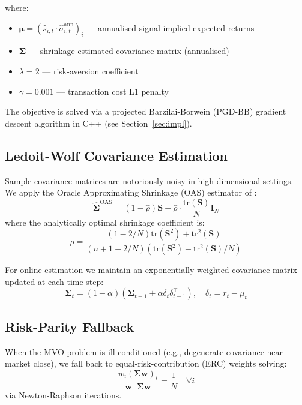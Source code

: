 \documentclass[11pt,a4paper]{article}
\newcommand{\bw}{\bm{w}}
\newcommand{\bmu}{\bm{\mu}}
\newcommand{\bSigma}{\bm{\Sigma}}
\newcommand{\tr}{\mathrm{tr}}
\begin{document}
where:
\begin{itemize}
  \item $\bmu = (\hat{s}_{i,t} \cdot \hat{\sigma}_{i,t}^{\mathrm{ann}})_i$ —
        annualised signal-implied expected returns
  \item $\bSigma$ — shrinkage-estimated covariance matrix (annualised)
  \item $\lambda = 2$ — risk-aversion coefficient
  \item $\gamma = 0.001$ — transaction cost L1 penalty
\end{itemize}

The objective is solved via a projected Barzilai-Borwein (PGD-BB) gradient descent
algorithm in C++ (see Section~\ref{sec:impl}).

\subsection{Ledoit-Wolf Covariance Estimation}

Sample covariance matrices are notoriously noisy in high-dimensional settings.
We apply the Oracle Approximating Shrinkage (OAS) estimator of \citet{chen2010}:
\begin{equation}
  \hat{\bSigma}^{\mathrm{OAS}} = (1 - \hat{\rho}) \mathbf{S} +
  \hat{\rho} \cdot \frac{\tr(\mathbf{S})}{N} \mathbf{I}_N
\end{equation}
where the analytically optimal shrinkage coefficient is:
\begin{equation}
  \hat{\rho} = \frac{(1 - 2/N)\tr(\mathbf{S}^2) + \tr^2(\mathbf{S})}
               {(n + 1 - 2/N)(\tr(\mathbf{S}^2) - \tr^2(\mathbf{S})/N)}
\end{equation}

For online estimation we maintain an exponentially-weighted covariance matrix updated
at each time step:
\begin{equation}
  \bSigma_t = (1 - \alpha)(\bSigma_{t-1} + \alpha \delta_t \delta_{t-1}^\top),
  \quad \delta_t = r_t - \mu_t
\end{equation}

\subsection{Risk-Parity Fallback}

When the MVO problem is ill-conditioned (e.g., degenerate covariance near market close),
we fall back to equal-risk-contribution (ERC) weights solving:
\begin{equation}
  \frac{w_i (\bSigma \bw)_i}{\bw^\top \bSigma \bw} = \frac{1}{N} \quad \forall i
\end{equation}
via Newton-Raphson iterations.
\end{document}
